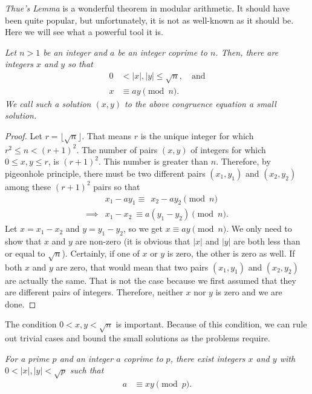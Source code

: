 \documentclass{subfile}
\begin{document}
\textit{Thue's Lemma} is a wonderful theorem in modular arithmetic. It should have been quite popular, but unfortunately, it is not as well-known as it should be. Here we will see what a powerful tool it is.

\begin{theorem}\slshape
	Let $n>1$ be an integer and $a$ be an integer coprime to $n$. Then, there are integers $x$ and $y$ so that 
	\begin{align*}
		0 &< |x|, |y| \leq \sqrt n, \quad \text{and}\\
		x&\equiv ay\pmod n.
	\end{align*}\label{thm:thue}
	We call such a solution $(x,y)$ to the above congruence equation a \textit{small solution}.
\end{theorem}

\begin{proof}
	Let $r=\lfloor\sqrt{n}\rfloor$. That means $r$ is the unique integer for which $r^2\leq n<(r+1)^2$. The number of pairs $(x,y)$ of integers for which $0\leq x,y\leq r$, is $(r+1)^2$. This number is greater than $n$. Therefore, by pigeonhole principle, there must be two different pairs $(x_1,y_1)$ and $(x_2,y_2)$ among these $(r+1)^2$ pairs so that 
	\begin{align*}
		& x_1-ay_1 \equiv \ \ x_2-ay_2 \pmod n\\
		\implies & x_1-x_2 \ \equiv a(y_1-y_2) \pmod n.
	\end{align*}
	Let $x=x_1-x_2$ and $y=y_1-y_2$, so we get $x\equiv ay\pmod n$. We only need to show that $x$ and $y$ are non-zero (it is obvious that $|x|$ and $|y|$ are both less than or equal to $\sqrt n$). Certainly, if one of $x$ or $y$ is zero, the other is zero as well. If both $x$ and $y$ are zero, that would mean that two pairs $(x_1,y_1)$ and $(x_2,y_2)$ are actually the same. That is not the case because we first assumed that they are different pairs of integers. Therefore, neither $x$ nor $y$ is zero and we are done.
\end{proof}
	
	\begin{note}
		The condition $0<x,y<\sqrt{n}$ is important. Because of this condition, we can rule out trivial cases and bound the small solutions as the problems require.
	\end{note}
	
	\begin{corollary}\slshape
		For a prime $p$ and an integer $a$ coprime to $p$, there exist integers $x$ and $y$ with $0<|x|,|y|<\sqrt{p}$ such that
		\begin{align*}
			a & \equiv xy\pmod p.
		\end{align*}
	\end{corollary}
	
\end{document}
